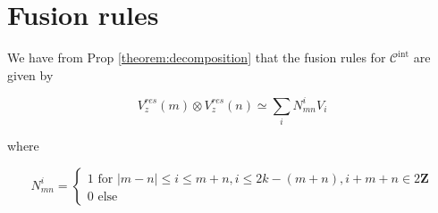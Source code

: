 \section{Fusion rules}

We have from Prop \ref{theorem:decomposition} that the fusion rules for
$\mathcal{C}^\text{int}$ are given by 

\begin{equation}
    V_z^{res}(m) \otimes V_z^{res}(n) \simeq \sum_i N_{mn}^i V_i
\end{equation}

where 

\begin{equation}
    N_{mn}^i = \begin{cases} 1 \text{ for } |m-n| \leq i \leq m+n, i \leq 2k - (m+n), i + m + n \in 2 \mathbf{Z} \\
                             0 \text{ else } 
               \end{cases}
\end{equation}



